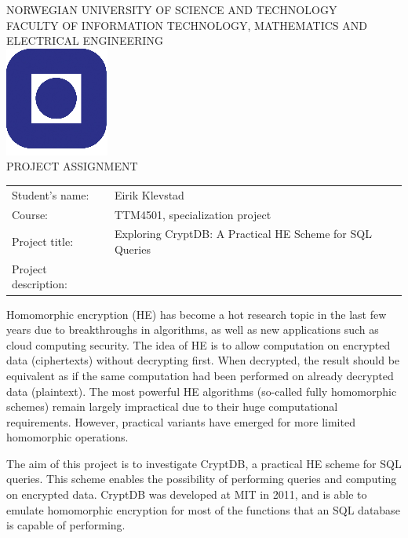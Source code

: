 \documentclass[a4paper,11pt]{article}
\begin{document}
\sffamily
\begin{titlepage}
\begin{center}
\textsc{NORWEGIAN UNIVERSITY OF SCIENCE AND TECHNOLOGY\\
FACULTY OF  INFORMATION TECHNOLOGY, MATHEMATICS AND ELECTRICAL ENGINEERING} \\
\vspace{0.5cm} 
\includegraphics[scale=0.5]{NTNU-logo} \\
\vspace{1.0cm}
{\Huge{PROJECT ASSIGNMENT}}
\vspace{1.0cm}
\end{center}

\begin{tabular}{@{}p{5cm}l}
Student's name:		& Eirik Klevstad\\
Course: 		& TTM4501, specialization project \\
Project title: 		& Exploring CryptDB: A Practical HE Scheme for SQL Queries \\
Project description: 	& \\
\end{tabular}

Homomorphic encryption (HE) has become a hot research topic in the last few years due to breakthroughs in algorithms, as well as new applications such as cloud computing security. The idea of HE is to allow computation on encrypted data (ciphertexts) without decrypting first. When decrypted, the result should be equivalent as if the same computation had been performed on already decrypted data (plaintext). The most powerful HE algorithms (so-called fully homomorphic schemes) remain largely impractical due to their huge computational requirements. However, practical variants have emerged for more limited homomorphic operations.

The aim of this project is to investigate CryptDB, a practical HE scheme for SQL queries. This scheme enables the possibility of performing queries and computing on encrypted data. CryptDB was developed at MIT in 2011, and is able to emulate homomorphic encryption for most of the functions that an SQL database is capable of performing.


\end{titlepage}
\end{document}
